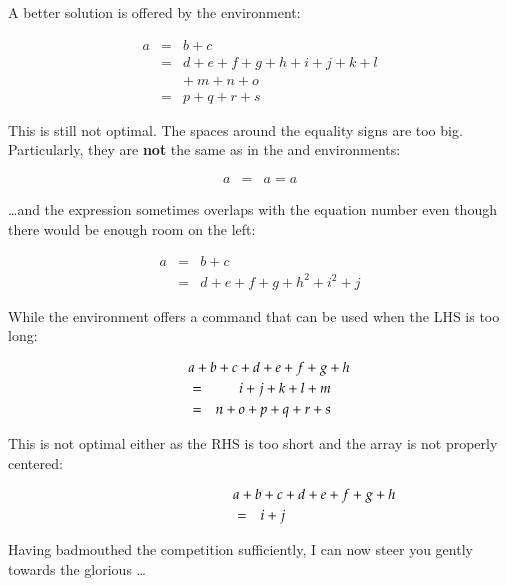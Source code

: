 A better solution is offered by the  environment:
\begin{example}
\begin{eqnarray}
  a & = & b + c \\
  & = & d + e + f + g + h + i 
  + j + k + l \nonumber \\
  && +\: m + n + o \\
  & = & p + q + r + s
\end{eqnarray}
\end{example}

This is still not optimal. The spaces around the equality signs are too big.
Particularly, they are \textbf{not} the same as in the
 and  environments:
\begin{example}
\begin{eqnarray}
  a & = & a = a
\end{eqnarray}
\end{example}

\noindent \ldots and the expression sometimes overlaps with the equation number even
  though there would be enough room on the left:
\begin{example}
\begin{eqnarray}
  a & = & b + c 
  \\
  & = & d + e + f + g + h^2 
  + i^2 + j 
  \label{eq:faultyeqnarray}
\end{eqnarray}
\end{example}

\noindent While the environment offers a command  that can
  be used when the LHS is too long:
\begin{example}
\begin{eqnarray}
  \lefteqn{a + b + c + d 
    + e + f + g + h}\nonumber\\
  & = & i + j + k + l + m 
  \\
  & = & n + o + p + q + r + s
\end{eqnarray}
\end{example}
\noindent This is not optimal either as the RHS is too short and the array is
not properly centered:
\begin{example}
\begin{eqnarray}
  \lefteqn{a + b + c + d 
    + e + f + g + h} 
  \nonumber \\
  & = & i + j 
\end{eqnarray}
\end{example}

\noindent Having badmouthed the competition sufficiently, I can now steer you gently towards the glorious \ldots

